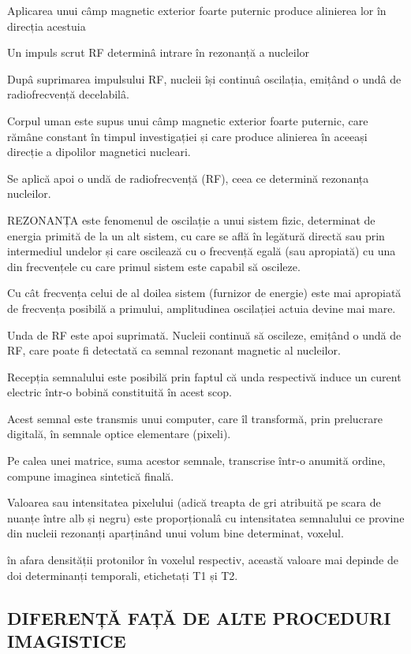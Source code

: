 \documentclass{article}
\begin{document}
Aplicarea unui câmp magnetic exterior foarte puternic produce alinierea lor în direcția acestuia 

Un impuls scrut RF determinâ intrare în rezonanță a nucleilor

Dupâ suprimarea impulsului RF, nucleii își continuâ oscilația, emițând o undâ de radiofrecvență decelabilâ.

Corpul uman este supus unui câmp magnetic exterior foarte puternic, care rămâne constant în timpul investigației și care produce alinierea în aceeași direcție a dipolilor magnetici nucleari.

Se aplică apoi o undă de radiofrecvență (RF), ceea ce determină rezonanța nucleilor. 

REZONANȚA este fenomenul de oscilație a unui sistem fizic, determinat de energia primită de la un alt sistem, cu care se află în legătură directă sau prin intermediul undelor și care oscilează cu o frecvență egală (sau apropiată) cu una din frecvențele cu care primul sistem este capabil să oscileze. 

Cu cât frecvența celui de al doilea sistem (furnizor de energie) este mai apropiată de frecvența posibilă a primului, amplitudinea oscilației actuia devine mai mare.

Unda de RF este apoi suprimată. Nucleii continuă să oscileze, emițând o undă de RF, care poate fi detectată ca semnal rezonant magnetic al nucleilor. 

Recepția semnalului este posibilă prin faptul că unda respectivă induce un curent electric într-o bobină constituită în acest scop.

Acest semnal este transmis unui computer, care îl transformă, prin prelucrare digitală, în semnale optice elementare (pixeli).

Pe calea unei matrice, suma acestor semnale, transcrise într-o anumită ordine, compune imaginea sintetică finală.

Valoarea sau intensitatea pixelului (adică treapta de gri atribuită pe scara de nuanțe între alb și negru) este proporționalâ cu intensitatea semnalului ce provine din nucleii rezonanți aparținând unui volum bine determinat, voxelul.

în afara densității protonilor în voxelul respectiv, această valoare mai depinde de doi determinanți temporali, etichetați T1 și T2. 

\subsection{DIFERENȚĂ FAȚĂ DE ALTE PROCEDURI IMAGISTICE }
\end{document}
